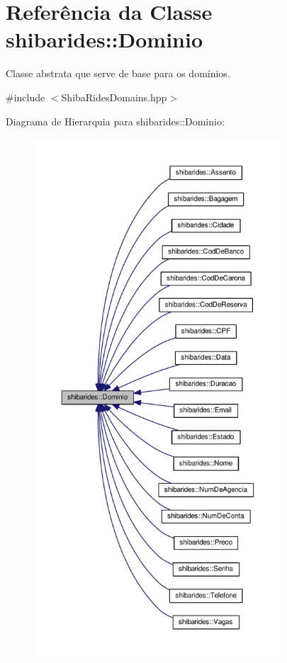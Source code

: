 \hypertarget{classshibarides_1_1Dominio}{}\section{Referência da Classe shibarides\+:\+:Dominio}
\label{classshibarides_1_1Dominio}


Classe abstrata que serve de base para os domínios.  




{\ttfamily \#include $<$Shiba\+Rides\+Domains.\+hpp$>$}



Diagrama de Hierarquia para shibarides\+:\+:Dominio\+:\nopagebreak
\begin{figure}[H]
\begin{center}
\leavevmode
\includegraphics[height=550pt]{classshibarides_1_1Dominio__inherit__graph}
\end{center}
\end{figure}
